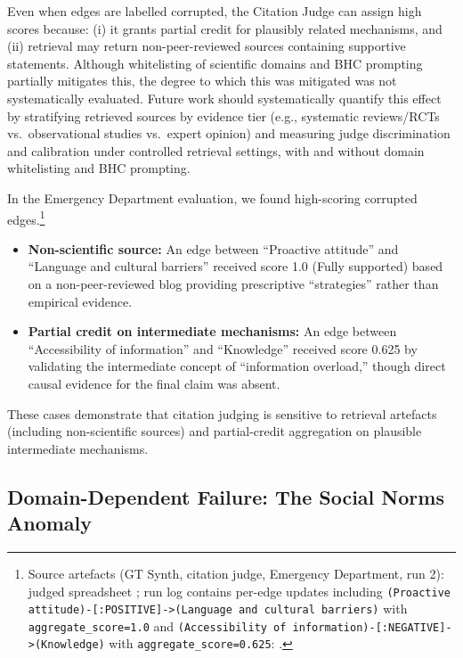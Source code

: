 Even when edges are labelled corrupted, the Citation Judge can assign high scores because: (i) it grants partial credit for plausibly related mechanisms, and (ii) retrieval may return non-peer-reviewed sources containing supportive statements. Although whitelisting of scientific domains and BHC prompting partially mitigates this, the degree to which this was mitigated was not systematically evaluated. Future work should systematically quantify this effect by stratifying retrieved sources by evidence tier (e.g., systematic reviews/RCTs vs.\ observational studies vs.\ expert opinion) and measuring judge discrimination and calibration under controlled retrieval settings, with and without domain whitelisting and BHC prompting.

In the Emergency Department evaluation, we found high-scoring corrupted edges.\footnote{Source artefacts (GT Synth, citation judge, Emergency Department, run 2): judged spreadsheet ; run log contains per-edge updates including \texttt{(Proactive attitude)-[:POSITIVE]->(Language and cultural barriers)} with \texttt{aggregate\_score=1.0} and \texttt{(Accessibility of information)-[:NEGATIVE]->(Knowledge)} with \texttt{aggregate\_score=0.625}: .}%
\begin{itemize}[noitemsep]
    \item \textbf{Non-scientific source:} An edge between ``Proactive attitude'' and ``Language and cultural barriers'' received score 1.0 (Fully supported) based on a non-peer-reviewed blog providing prescriptive ``strategies'' rather than empirical evidence.
    \item \textbf{Partial credit on intermediate mechanisms:} An edge between ``Accessibility of information'' and ``Knowledge'' received score 0.625 by validating the intermediate concept of ``information overload,'' though direct causal evidence for the final claim was absent.
\end{itemize}

These cases demonstrate that citation judging is sensitive to retrieval artefacts (including non-scientific sources) and partial-credit aggregation on plausible intermediate mechanisms.

\subsection{Domain-Dependent Failure: The Social Norms Anomaly}

